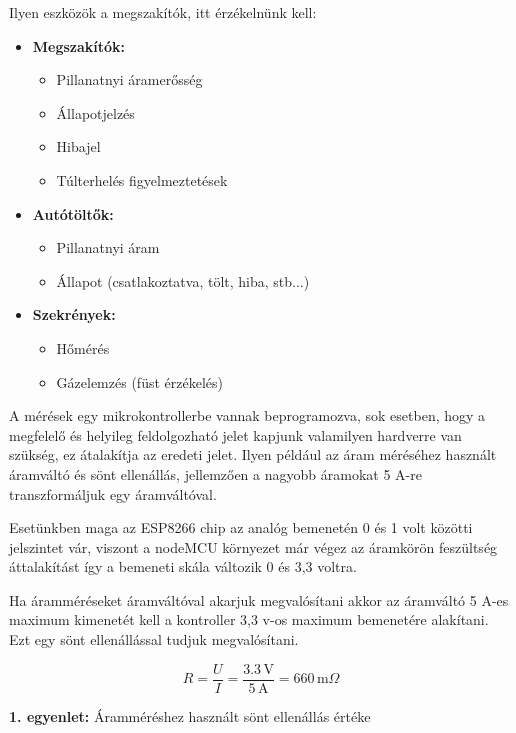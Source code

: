 Ilyen eszközök a megszakítók, itt érzékelnünk kell:
\begin{itemize}
    \item \textbf{Megszakítók:}
    \begin{itemize}
        \item Pillanatnyi áramerősség
        \item Állapotjelzés
        \item Hibajel
        \item Túlterhelés figyelmeztetések
    \end{itemize}
    \item \textbf{Autótöltők:}
    \begin{itemize}
        \item Pillanatnyi áram
        \item Állapot (csatlakoztatva, tölt, hiba, stb...)
    \end{itemize}
    \item \textbf{Szekrények:}
    \begin{itemize}
        \item Hőmérés
        \item Gázelemzés (füst érzékelés)
    \end{itemize}
\end{itemize}

A mérések egy mikrokontrollerbe vannak beprogramozva, sok esetben, 
hogy a megfelelő és helyileg feldolgozható jelet kapjunk valamilyen hardverre van szükség, ez átalakítja az eredeti jelet. 
Ilyen például az áram méréséhez használt áramváltó és sönt ellenállás, jellemzően a nagyobb áramokat 5 A-re transzformáljuk 
egy áramváltóval.

Esetünkben maga az ESP8266 chip az analóg bemenetén 0 és 1 volt közötti jelszintet vár, 
viszont a nodeMCU környezet már végez az áramkörön feszültség áttalakítást így a bemeneti skála változik 0 és 3,3 voltra.

Ha áramméréseket áramváltóval akarjuk megvalósítani akkor az áramváltó 5 A-es maximum kimenetét kell 
a kontroller 3,3 v-os maximum bemenetére alakítani. Ezt egy sönt ellenállással tudjuk megvalósítani.


\begin{equation}
    R = \frac{U}{I} = \frac{3.3 \, \text{V}}{5 \, \text{A}} = 660 \, \text{m}\Omega
\end{equation}
\begin{center}
    \textbf{1. egyenlet:} Áramméréshez használt sönt ellenállás értéke
\end{center}
    

